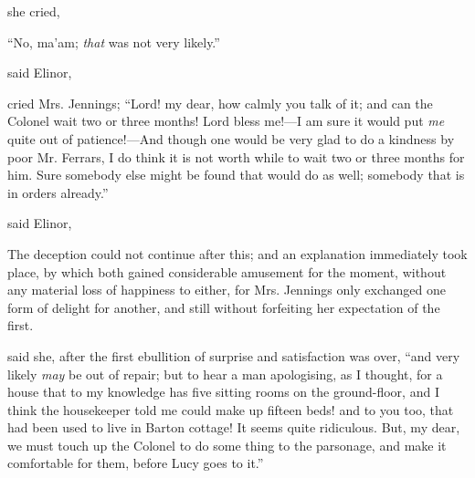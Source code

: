  she cried, 

“No, ma'am; {\em that} was not very likely.”


 said Elinor, 

 cried Mrs. Jennings; “Lord! my dear, how calmly you talk of it; and can the Colonel wait two or three months! Lord bless me!---I am sure it would put {\em me} quite out of patience!---And though one would be very glad to do a kindness by poor Mr. Ferrars, I do think it is not worth while to wait two or three months for him. Sure somebody else might be found that would do as well; somebody that is in orders already.”

 said Elinor, 


The deception could not continue after this; and an explanation immediately took place, by which both gained considerable amusement for the moment, without any material loss of happiness to either, for Mrs. Jennings only exchanged one form of delight for another, and still without forfeiting her expectation of the first.

 said she, after the first ebullition of surprise and satisfaction was over, “and very likely {\em may} be out of repair; but to hear a man apologising, as I thought, for a house that to my knowledge has five sitting rooms on the ground-floor, and I think the housekeeper told me could make up fifteen beds! and to you too, that had been used to live in Barton cottage! It seems quite ridiculous. But, my dear, we must touch up the Colonel to do some thing to the parsonage, and make it comfortable for them, before Lucy goes to it.”

